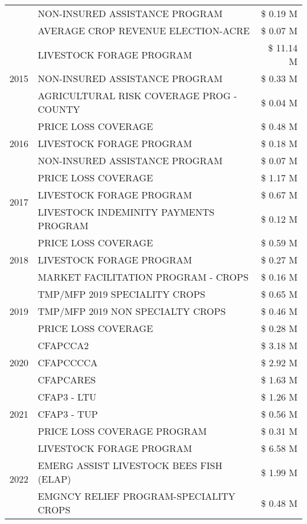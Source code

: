 \begin{tabular}{llr}
 & NON-INSURED ASSISTANCE PROGRAM & \$ 0.19 M \\
 & AVERAGE CROP REVENUE ELECTION-ACRE & \$ 0.07 M \\
\cline{1-3}
\multirow[t]{3}{*}{2015} & LIVESTOCK FORAGE PROGRAM & \$ 11.14 M \\
 & NON-INSURED ASSISTANCE PROGRAM & \$ 0.33 M \\
 & AGRICULTURAL RISK COVERAGE PROG - COUNTY & \$ 0.04 M \\
\cline{1-3}
\multirow[t]{3}{*}{2016} & PRICE LOSS COVERAGE & \$ 0.48 M \\
 & LIVESTOCK FORAGE PROGRAM & \$ 0.18 M \\
 & NON-INSURED ASSISTANCE PROGRAM & \$ 0.07 M \\
\cline{1-3}
\multirow[t]{3}{*}{2017} & PRICE LOSS COVERAGE & \$ 1.17 M \\
 & LIVESTOCK FORAGE PROGRAM & \$ 0.67 M \\
 & LIVESTOCK INDEMINITY PAYMENTS PROGRAM & \$ 0.12 M \\
\cline{1-3}
\multirow[t]{3}{*}{2018} & PRICE LOSS COVERAGE & \$ 0.59 M \\
 & LIVESTOCK FORAGE PROGRAM & \$ 0.27 M \\
 & MARKET FACILITATION PROGRAM - CROPS & \$ 0.16 M \\
\cline{1-3}
\multirow[t]{3}{*}{2019} & TMP/MFP 2019 SPECIALITY CROPS & \$ 0.65 M \\
 & TMP/MFP 2019 NON SPECIALTY CROPS & \$ 0.46 M \\
 & PRICE LOSS COVERAGE & \$ 0.28 M \\
\cline{1-3}
\multirow[t]{3}{*}{2020} & CFAPCCA2 & \$ 3.18 M \\
 & CFAPCCCCA & \$ 2.92 M \\
 & CFAPCARES & \$ 1.63 M \\
\cline{1-3}
\multirow[t]{3}{*}{2021} & CFAP3 - LTU & \$ 1.26 M \\
 & CFAP3 - TUP & \$ 0.56 M \\
 & PRICE LOSS COVERAGE PROGRAM & \$ 0.31 M \\
\cline{1-3}
\multirow[t]{3}{*}{2022} & LIVESTOCK FORAGE PROGRAM & \$ 6.58 M \\
 & EMERG ASSIST LIVESTOCK BEES FISH (ELAP) & \$ 1.99 M \\
 & EMGNCY RELIEF PROGRAM-SPECIALITY CROPS & \$ 0.48 M \\
\cline{1-3}
\bottomrule
\end{tabular}
